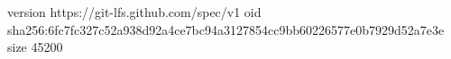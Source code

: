 version https://git-lfs.github.com/spec/v1
oid sha256:6fc7fc327c52a938d92a4ce7bc94a3127854cc9bb60226577e0b7929d52a7e3e
size 45200
